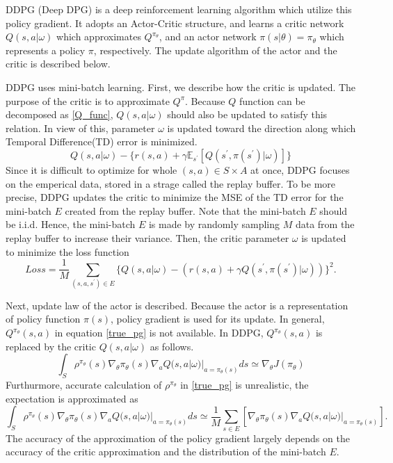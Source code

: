 \documentclass[english, dvipdfmx]{ampmt}             %
\newcommand{\expect}{\mathbb{E}}
\begin{document}
DDPG (Deep DPG)\cite{DDPG} is a deep reinforcement learning algorithm which utilize this policy gradient. It adopts an Actor-Critic structure, and learns a critic network $Q(s,a|\omega)$ which approximates $Q^{\pi_{\theta}}$, and an actor network $\pi(s|\theta)=\pi_{\theta}$ which represents a policy $\pi$, respectively. The update algorithm of the actor and the critic is described below.\par
DDPG uses mini-batch learning. First, we describe how the critic is updated. The purpose of the critic is to approximate $Q^{\pi}$. Because $Q$ function can be decomposed as \eqref{Q_func}, $Q(s,a|\omega)$ should also be updated to satisfy this relation. In view of this, parameter $\omega$ is updated toward the direction along which Temporal Difference(TD) error is minimized.
\begin{equation}
	Q(s,a|\omega) - \{r(s,a)+\gamma \expect_{s^{\prime}}[Q(s^{\prime},\pi(s^{\prime})|\omega)]\}
\end{equation}
Since it is difficult to optimize for whole $(s,a) \in S\times A$ at once, DDPG focuses on the emperical data, stored in a strage called the replay buffer. To be more precise, DDPG updates the critic to minimize the MSE of the TD error for the mini-batch $E$ created from the replay buffer. Note that the mini-batch $E$ should be i.i.d. Hence, the mini-batch $E$ is made by randomly sampling $M$ data from the replay buffer to increase their variance. Then, the critic parameter $\omega$ is updated to minimize the loss function
\begin{equation}
	Loss = \frac{1}{M}\sum_{(s,a,s^{\prime})\in E} \{Q(s,a|\omega) - (r(s,a)+\gamma Q(s^{\prime},\pi(s^{\prime})|\omega))\}^2.
\end{equation}\par
Next, update law of the actor is described. Because the actor is a representation of policy function $\pi(s)$, policy gradient is used for its update. In general, $Q^{\pi_{\theta}}(s,a)$ in equation \eqref{true_pg} is not available. In DDPG, $Q^{\pi_{\theta}}(s,a)$ is replaced by the critic $Q(s,a|\omega)$ as follows.
\begin{equation}
	\int_S\rho^{\pi_{\theta}}(s)\nabla_{\theta}\pi_{\theta}(s)\nabla_{a}Q(s, a|\omega)|_{a=\pi_{\theta}(s)}ds \simeq \nabla_{\theta}J(\pi_{\theta}) 
\end{equation}
Furthurmore, accurate calculation of $\rho^{\pi_{\theta}}$  in \eqref{true_pg} is unrealistic, the expectation is approximated as
 \begin{equation}
	\int_S\rho^{\pi_{\theta}}(s)\nabla_{\theta}\pi_{\theta}(s)\nabla_{a}Q(s, a|\omega)|_{a=\pi_{\theta}(s)}ds \simeq \frac{1}{M}\sum_{s\in E}[\nabla_{\theta}\pi_{\theta}(s)\nabla_{a}Q(s, a|\omega)|_{a=\pi_{\theta}(s)}]. \label{expectation_approximation}
\end{equation}
The accuracy of the approximation of the policy gradient largely depends on the accuracy of the critic approximation and the distribution of the mini-batch $E$.
\end{document}
